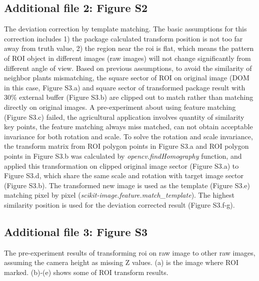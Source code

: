 \documentclass{configs/bmcart}
\begin{document}
\begin{backmatter}
\subsection*{Additional file 2: Figure S2}
The deviation correction by template matching. The basic assumptions for this correction includes 1) the package calculated transform position is not too far away from truth value, 2) the region near the \acrfull*{roi} is flat, which means the pattern of ROI object in different images (raw images) will not change significantly from different angle of view. Based on previous assumptions, to avoid the similarity of neighbor plants mismatching, the square sector of ROI on original image (DOM in this case, Figure S3.a) and square sector of transformed package result with 30\% external buffer (Figure S3.b) are clipped out to match rather than matching directly on original images. A pre-experiment about using feature matching (Figure S3.c) failed, the agricultural application involves quantity of similarity key points, the feature matching always miss matched, can not obtain acceptable invariance for both rotation and scale. To solve the rotation and scale invariance, the transform matrix from ROI polygon points in Figure S3.a and ROI polygon points in Figure S3.b was calculated by \textit{opencv.findHomography} function, and applied this transformation on clipped original image sector (Figure S3.a) to Figure S3.d, which share the same scale and rotation with target image sector (Figure S3.b). The transformed new image is used as the template (Figure S3.e) matching pixel by pixel (\textit{scikit-image.feature.match\_template}). The highest similarity position is used for the deviation corrected result (Figure S3.f-g).

\subsection*{Additional file 3: Figure S3}
The pre-experiment results of transforming \acrfull*{roi} on raw image to other raw images, assuming the camera height as missing Z values. (a) is the image where ROI marked. (b)-(e) shows some of ROI transform results. 




\end{backmatter}
\end{document}
